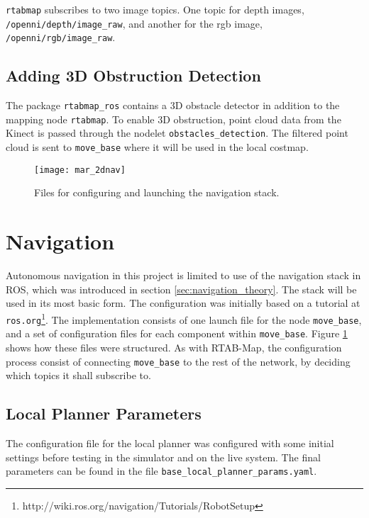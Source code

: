 \texttt{rtabmap} subscribes to two image topics. One topic for depth images, \texttt{/openni/depth/image\_raw}, and another for the rgb image, \texttt{/openni/rgb/image\_raw}. 

\subsection{Adding 3D Obstruction Detection}

The package \texttt{rtabmap\_ros} contains a 3D obstacle detector in addition to the mapping node \texttt{rtabmap}. To enable 3D obstruction, point cloud data from the Kinect is passed through the nodelet \texttt{obstacles\_detection}. The filtered point cloud is sent to \texttt{move\_base} where it will be used in the local costmap.

\begin{figure}[H]
	\centering
	\texttt{[image: mar\_2dnav]}
	\caption{Files for configuring and launching the navigation stack.}
	\label{fig:mar_2dnav}
\end{figure}

\section{Navigation}
\label{sec:navigation}
Autonomous navigation in this project is limited to use of the navigation stack in \ac{ROS}, which was introduced in section \ref{sec:navigation_theory}. The stack will be used in its most basic form. The configuration was initially based on a tutorial at \texttt{ros.org}\footnote{http://wiki.ros.org/navigation/Tutorials/RobotSetup}. The implementation consists of one launch file for the node \texttt{move\_base}, and a set of configuration files for each component within \texttt{move\_base}. Figure \ref{fig:mar_2dnav} shows how these files were structured. As with \ac{RTAB-Map}, the configuration process consist of connecting \texttt{move\_base} to the rest of the network, by deciding which topics it shall subscribe to. 

\subsection{Local Planner Parameters}

The configuration file for the local planner was configured with some initial settings before testing in the simulator and on the live system. The final parameters can be found in the file \texttt{base\_local\_planner\_params.yaml}.

